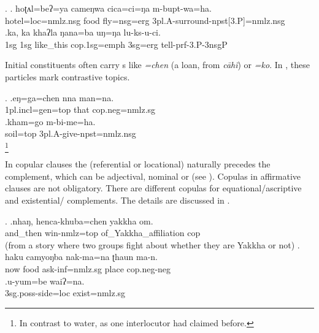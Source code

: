 \ex. \ag.   hoʈʌl=beʔ=ya          cameŋwa  cica=ci=ŋa      m-bupt-wa=ha.\\
hotel{\sc =loc=nmlz.nsg} food fly{\sc =nsg=erg} {\sc 3pl.A-}surround{\sc -npst[3.P]=nmlz.nsg}\\
 
\bg.ka,  ka  khaʔla   ŋana=ba                uŋ=ŋa   lu-ks-u-ci.\\
{\sc 1sg} {\sc 1sg} like\_this {\sc cop.1sg=emph} {\sc 3sg=erg} tell{\sc -prf-3.P-3nsgP}\\
 
 
 Initial constituents often carry s  like \emph{=chen} (a  loan, from  \emph{cāhĩ}) or \emph{=ko}. In \Next, these particles mark  contrastive topics.
 
 \ex. \ag.eŋ=ga=chen                nna  man=na.\\
 {\sc 1pl.incl=gen=top} that  {\sc cop.neg=nmlz.sg}\\
   
 \bg.kham=go     m-bi-me=ha.\\
 soil{\sc =top} {\sc 3pl.A-}give{\sc -npst=nmlz.nsg}\\
 \footnote{In contrast to water, as one interlocutor had claimed before.}
 
 In copular clauses the   (referential or locational) naturally precedes the complement, which can be adjectival, nominal or  (see \Next). Copulas in affirmative clauses are not obligatory. There are different copulas for equational/ascriptive  and existential/ complements. The details are discussed in . 
 
 \ex. \ag.nhaŋ,    henca-khuba=chen  yakkha          om.\\
 and\_then win{\sc -nmlz=top} of\_Yakkha\_affiliation {\sc cop}\\
  (from a story where two groups fight about whether they are Yakkha or not) 
   	\bg.  haku        camyoŋba  nak-ma=na               ʈhaun ma-n.\\
		now food ask{\sc -inf=nmlz.sg} place {\sc cop.neg-neg}\\
	 
	\bg.u-yum=be waiʔ=na.\\
	{\sc 3sg.poss-}side{\sc =loc} exist{\sc [3]=nmlz.sg}\\
	
